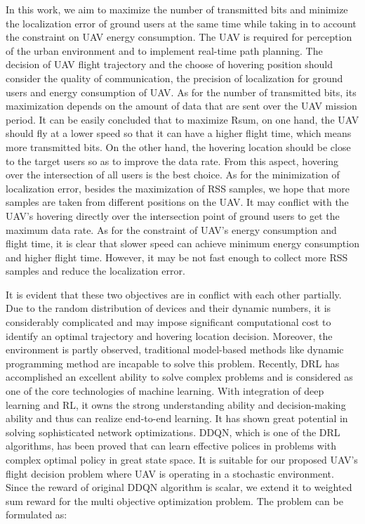 \documentclass[journal,twocolumn]{IEEEtran}
\begin{document}
In this work, we aim to maximize the number of transmitted bits and
minimize the localization error of ground users at the same time while taking in to account the constraint on UAV energy consumption. The UAV is required for perception of the urban environment and to implement real-time path planning. The decision of UAV flight trajectory and the choose of hovering position should consider the quality of communication, the precision of localization for ground users and energy consumption of UAV. As for the number of transmitted bits, its maximization depends on the amount of  data that are sent over the UAV mission period. It can be easily concluded that to maximize Rsum, on one hand, the UAV should fly at a lower speed so that it can have a higher flight time, which means more transmitted bits. On the other hand, the hovering location should be close to the target users so as to improve the data rate. From this aspect, hovering over the intersection of all users is the best choice. As for the minimization of localization error, besides the maximization of RSS samples, we hope that more samples are taken from different positions on the UAV. It may conflict with the UAV’s hovering directly over the intersection point of ground users to get the maximum data rate. As for the constraint of UAV’s energy consumption and flight time, it is clear that slower speed can achieve minimum energy consumption and higher flight time. However, it may be not fast enough to collect more RSS samples and reduce the localization error.

It is evident that these two objectives are in conflict with each other partially. Due to the random distribution of devices and their dynamic numbers, it is considerably complicated and may impose significant computational cost to identify an optimal trajectory and hovering location decision. Moreover, the environment is partly observed, traditional model-based methods like dynamic programming method are incapable to solve this problem. Recently, DRL has accomplished an excellent ability to solve complex problems and is considered as one of the core technologies of machine learning. With integration of deep learning and RL, it owns the strong understanding ability and decision-making ability and thus can realize end-to-end learning. It has shown great potential in solving sophisticated network optimizations. DDQN, which is one of the DRL algorithms, has been proved that can learn effective polices in problems with complex optimal policy in great state space. It is suitable for our proposed UAV’s flight decision problem where UAV is operating in a stochastic environment. Since the reward of original DDQN algorithm is scalar, we extend it to weighted sum reward for the multi objective optimization problem. The problem can be formulated as:
\end{document}
